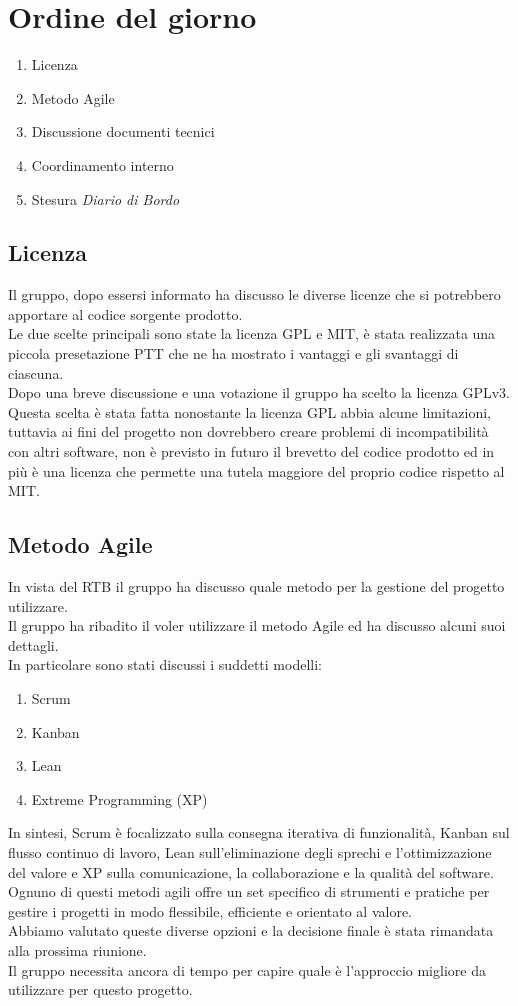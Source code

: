 \section{Ordine del giorno}
\begin{enumerate}
\item Licenza
\item Metodo Agile
\item Discussione documenti tecnici
\item Coordinamento interno 
\item Stesura \textit{Diario di Bordo}
\end{enumerate}

\subsection{Licenza}
Il gruppo, dopo essersi informato ha discusso le diverse licenze che si potrebbero apportare al codice sorgente prodotto.\\
Le due scelte principali sono state la licenza GPL e MIT, è stata realizzata una piccola presetazione PTT che ne ha mostrato i vantaggi e gli svantaggi di ciascuna.\\
Dopo una breve discussione e una votazione il gruppo ha scelto la licenza GPLv3. 
Questa scelta è stata fatta nonostante la licenza GPL abbia alcune limitazioni, tuttavia ai fini del progetto non dovrebbero creare problemi
di incompatibilità con altri software, non è previsto in futuro il brevetto del codice prodotto ed in più è una licenza che permette una tutela maggiore del proprio
codice rispetto al MIT.

\subsection{Metodo Agile}
In vista del RTB il gruppo ha discusso quale metodo per la gestione del progetto utilizzare.\\
Il gruppo ha ribadito il voler utilizzare il metodo Agile ed ha discusso alcuni suoi dettagli.\\
In particolare sono stati discussi i suddetti modelli:
\begin{enumerate}
    \item Scrum
    \item Kanban
    \item Lean
    \item Extreme Programming (XP)
\end{enumerate}
In sintesi, Scrum è focalizzato sulla consegna iterativa di funzionalità, 
Kanban sul flusso continuo di lavoro, 
Lean sull'eliminazione degli sprechi e l'ottimizzazione del valore e XP sulla comunicazione, 
la collaborazione e la qualità del software.\\
Ognuno di questi metodi agili offre un set specifico di strumenti e pratiche per gestire i progetti in modo flessibile, efficiente e orientato al valore.\\
Abbiamo valutato queste diverse opzioni e la decisione finale è stata rimandata alla prossima riunione.\\
Il gruppo necessita ancora di tempo per capire quale è l'approccio migliore da utilizzare per questo progetto.

